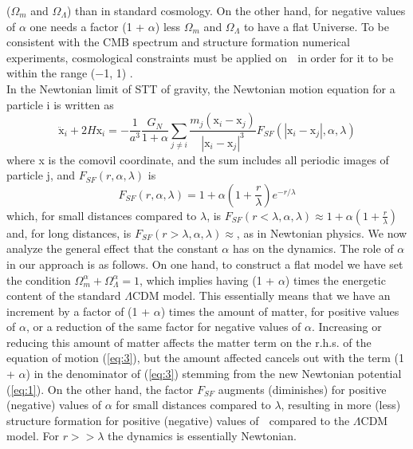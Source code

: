 \documentclass{article}
\begin{document}
($\Omega_m$ and $\Omega_\Lambda$) than in standard cosmology. On the other
hand, for negative values of $\alpha$ one needs a factor (1 + $\alpha$)
less $\Omega_m$ and $\Omega_\Lambda$ to have a flat Universe. To be consistent
with the CMB spectrum and structure formation
numerical experiments, cosmological constraints must be
applied on  in order for it to be within the range (−1, 1) \cite{13_Nagata2002,14_Nagata2004,15_Shirata2005,16_Umezu2005}.\\
In the Newtonian limit of STT of gravity, the Newtonian
motion equation for a particle i is written as\\
\begin{equation}
\ddot{\mathrm{x}}_{i}+2 H \mathrm{x}_{i}=-\frac{1}{a^{3}} \frac{G_{N}}{1+\alpha} \sum_{j \neq i} \frac{m_{j}\left(\mathrm{x}_{i}-\mathrm{x}_{j}\right)}{\left|\mathrm{x}_{i}-\mathrm{x}_{j}\right|^{3}} F_{S F}\left(\left|\mathrm{x}_{i}-\mathrm{x}_{j}\right|, \alpha, \lambda\right)
\label{eq:3}
\end{equation}
where x is the comovil coordinate, and the sum includes
all periodic images of particle j, and $F_{S F}(r, \alpha, \lambda)$ is\\
\begin{equation}
F_{S F}(r, \alpha, \lambda)=1+\alpha\left(1+\frac{r}{\lambda}\right) e^{-r / \lambda}
\label{eq:4}
\end{equation}
which, for small distances compared to $\lambda$, is $F_{S F}(r<\lambda, \alpha, \lambda) \approx 1+\alpha\left(1+\frac{r}{\lambda}\right)$ and, for long distances, is $F_{S F}(r>\lambda, \alpha, \lambda) \approx$, as in Newtonian physics.
We now analyze the general effect that the constant
$\alpha$ has on the dynamics. The role of $\alpha$ in our approach
is as follows. On one hand, to construct a flat model
we have set the condition $\Omega_{m}^{\alpha}+\Omega_{\Lambda}^{\alpha}=1$, which implies having (1 + $\alpha$) times the energetic content of the standard
$\Lambda$CDM model. This essentially means that we have
an increment by a factor of (1 + $\alpha$) times the amount
of matter, for positive values of $\alpha$, or a reduction of the
same factor for negative values of $\alpha$. Increasing or reducing
this amount of matter affects the matter term on
the r.h.s. of the equation of motion (\ref{eq:3}), but the amount
affected cancels out with the term (1 + $\alpha$) in the denominator
of (\ref{eq:3}) stemming from the new Newtonian potential
(\ref{eq:1}). On the other hand, the factor $F_{SF}$ augments (diminishes)
for positive (negative) values of $\alpha$ for small distances
compared to $\lambda$, resulting in more (less) structure
formation for positive (negative) values of  compared to
the $\Lambda$CDM model. For $r>>\lambda$ the dynamics is essentially
Newtonian.
\end{document}
